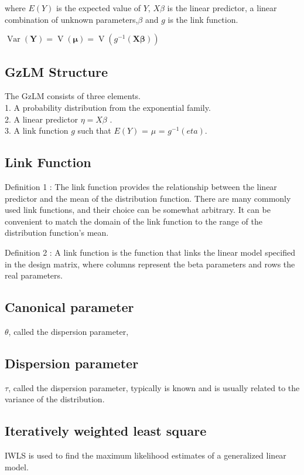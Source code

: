 \documentclass[Main.tex]{subfiles}
\begin{document}
	where $E(Y)$ is the expected value of $Y$, $X\beta$ is the linear
	predictor, a linear combination of unknown parameters,$\beta$ and
	$g$ is the link function.
	
	
	$\operatorname{Var}(\mathbf{Y}) = \operatorname{V}(
	\boldsymbol{\mu} ) =
	\operatorname{V}(g^{-1}(\mathbf{X}\boldsymbol{\beta}))$
	\\
	
	
	\subsection{GzLM Structure}
	The GzLM consists of three elements. \\1. A probability
	distribution from the exponential family. \\2. A linear predictor
	$\eta= X\beta$ . \\3. A link function $g$ such that $E(Y)$ = $\mu$
	= $g^{-1}(eta)$.
	
	\subsection{Link Function}
	Definition 1 : The link function provides the relationship between
	the linear predictor and the mean of the distribution function.
	There are many commonly used link functions, and their choice can
	be somewhat arbitrary. It can be convenient to match the domain of
	the link function to the range of the distribution function's
	mean.
	
	\noindent Definition 2 : A link function is the function that
	links the linear model specified in the design matrix, where
	columns represent the beta parameters and rows the real
	parameters.
	
	\subsection{Canonical parameter}
	$\theta$, called the dispersion parameter,
	\subsection{Dispersion parameter}
	$\tau$, called the dispersion parameter, typically is known and is
	usually related to the variance of the distribution.
	
	\subsection{Iteratively weighted least square}
	IWLS is used to find the maximum likelihood estimates of a
	generalized linear model.
	
\end{document}
